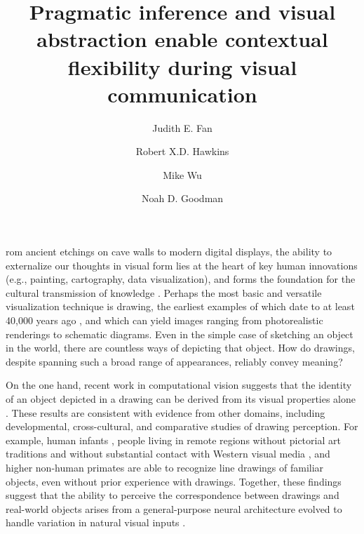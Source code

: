 \documentclass[9pt,twocolumn,twoside]{pnas-new}
\title{Pragmatic inference and visual abstraction enable contextual flexibility during visual communication}
\author[a,c,1]{Judith E. Fan}
\author[a]{Robert X.D. Hawkins}
\author[b]{Mike Wu}
\author[a,b]{Noah D. Goodman}
\affil[a]{Department of Psychology, Stanford University}
\affil[b]{Department of Computer Science, Stanford University}
\affil[c]{Department of Psychology, University of California, San Diego}
\begin{document}
\verticaladjustment{-2pt}

\maketitle
\thispagestyle{firststyle}

\noindent {}rom ancient etchings on cave walls to modern digital displays, the ability to externalize our thoughts in visual form lies at the heart of key human innovations (e.g., painting, cartography, data visualization), and forms the foundation for the cultural transmission of knowledge \cite{tomasello2009cultural,donald1991origins}. 
Perhaps the most basic and versatile visualization technique is drawing, the earliest examples of which date to at least 40,000 years ago \cite{hoffmann2018u,Aubert:2014jy}, and which can yield images ranging from photorealistic renderings to schematic diagrams. 
Even in the simple case of sketching an object in the world, there are countless ways of depicting that object. 
How do drawings, despite spanning such a broad range of appearances, reliably convey meaning? 

On the one hand, recent work in computational vision suggests that the identity of an object depicted in a drawing can be derived from its visual properties alone \cite{FanCommon2018}.
These results are consistent with evidence from other domains, including developmental, cross-cultural, and comparative studies of drawing perception. 
For example, human infants \cite{hochberg1962pictorial}, people living in remote regions without pictorial art traditions and without substantial contact with Western visual media \cite{kennedy1975outline}, and higher non-human primates \cite{tanaka2007recognition} are able to recognize line drawings of familiar objects, even without prior experience with drawings.
Together, these findings suggest that the ability to perceive the correspondence between drawings and real-world objects arises from a general-purpose neural architecture evolved to handle variation in natural visual inputs \cite{Sayim:2011bz,gibson2014ecological}. 
\end{document}
